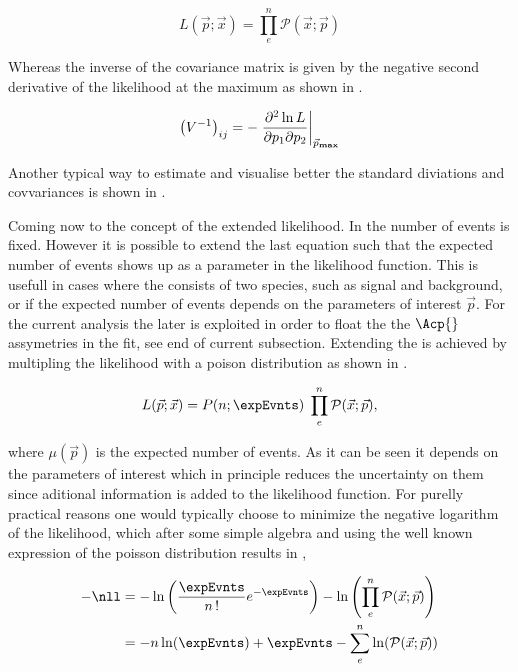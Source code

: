 \begin{equation}
L(\vec{p};\vec{x}) = \prod_e^n \mathcal{P}(\vec{x};\vec{p})
\label{likelihood}
\end{equation}

\noindent Whereas the inverse of the covariance matrix is given by the negative second derivative of the likelihood at the maximum as shown in .

\begin{equation}
\left( V^{-1} \right)_{ij} = - \left. \frac{\partial^2\ln L}{\partial p_1 \partial p_2} \right|_{ \vec{p}_{\rm\bf max}}
\label{covariance}
\end{equation}

\noindent Another typical way to estimate and visualise better the standard diviations and covvariances is shown in . 

Coming now to the concept of the extended likelihood. In  the number of events is fixed. However it is possible to 
extend the last equation such that the expected number of events shows up as a parameter in the likelihood function. This is usefull
in cases where the \pdf consists of two species, such as signal and background, or if the expected number of events depends on the 
parameters of interest $\vec{p}$. For the current analysis the later is exploited in order to float the the $\Acp{}$ assymetries in the fit,
see end of current subsection. Extending the \pdf is achieved by multipling the likelihood with a poison distribution as shown in .

\begin{equation}
L(\vec{p};\vec{x}) = P(n;\expEvnts) \; \prod_e^n \mathcal{P}(\vec{x};\vec{p}),
\label{extlikelihood}
\end{equation}

\noindent where $\mu(\vec{p})$ is the expected number of events. As it can be seen it depends on the parameters of interest which in 
principle reduces the uncertainty on them since aditional information is added to the likelihood function.
For purelly practical reasons one would typically choose to minimize the negative logarithm of the likelihood, which after some simple
algebra and using the well known expression of the poisson distribution results in ,

\begin{align}
  -\nll &= -\ln\left( \frac{\expEvnts}{n\,!} e^{-\expEvnts } \right) - \ln\left( \prod_e^n \mathcal{P}(\vec{x};\vec{p}) \right)  \nonumber \\
        &= - n\ln(\expEvnts) + \expEvnts - \sum_e^n \ln( \mathcal{P}(\vec{x};\vec{p}) )
\label{extloglikelihood}
\end{align}


